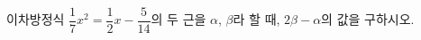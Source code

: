 이차방정식 $\dfrac{1}{7}x^2=\dfrac{1}{2}x-\dfrac{5}{14}$의 두 근을 $\alpha$, $\beta$라 할 때, $2\beta-\alpha$의 값을 구하시오. \cond{$\alpha<\beta$}
